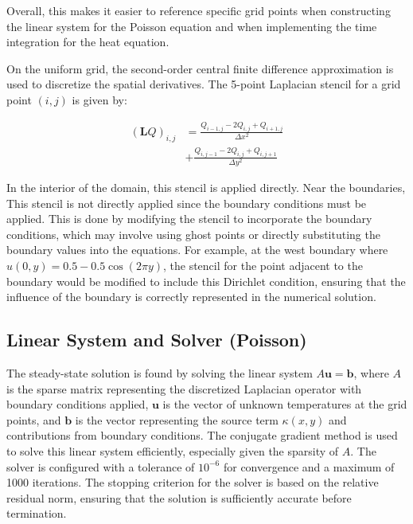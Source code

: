 \documentclass[
  aapm,
  amsmath,amssymb,
  reprint,          %
  floatfix
]{revtex4-2}
\begin{document}
Overall, this makes it easier to reference specific grid points when constructing 
the linear system for the Poisson equation and when implementing the time integration 
for the heat equation.

On the uniform grid, the second-order central finite difference approximation is used to
discretize the spatial derivatives. The 5-point Laplacian stencil for a grid point $(i,j)$ 
is given by:

\begin{equation}
\begin{split}
(\mathbf{L}Q)_{i,j} &= \frac{Q_{i-1,j} - 2Q_{i,j} + Q_{i+1,j}}{\Delta x^2} \\
                    &+ \frac{Q_{i,j-1} - 2Q_{i,j} + Q_{i,j+1}}{\Delta y^2}
\end{split}
\end{equation}

In the interior of the domain, this stencil is applied directly. Near the boundaries, 
This stencil is not directly applied since the boundary conditions must be applied. 
This is done by modifying the stencil to incorporate the boundary conditions, which may involve
using ghost points or directly substituting the boundary values into the equations. For example,
at the west boundary where $u(0,y) = 0.5 - 0.5\cos(2\pi y)$, the stencil for the point adjacent 
to the boundary would be modified to include this Dirichlet condition, 
ensuring that the influence of the boundary is correctly represented in the numerical solution.


\subsection{Linear System and Solver (Poisson)}

The steady-state solution is found by solving the linear system $A\mathbf{u} = \mathbf{b}$, 
where $A$ is the sparse matrix representing the discretized Laplacian operator with boundary 
conditions applied, $\mathbf{u}$ is the vector of unknown temperatures at the grid points, 
and $\mathbf{b}$ is the vector representing the source term $\kappa(x,y)$ and contributions 
from boundary conditions. The conjugate gradient method is used to solve this linear system 
efficiently, especially given the sparsity of $A$. The solver is configured with a 
tolerance of $10^{-6}$ for convergence and a maximum of 1000 iterations. 
The stopping criterion for the solver is based on the relative residual norm, 
ensuring that the solution is sufficiently accurate before termination.
\end{document}
